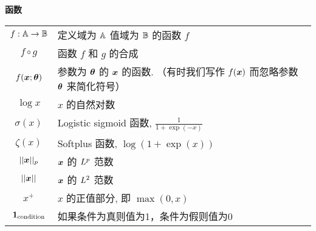 \begin{minipage}{\textwidth}
\centerline{\bf 函数}
\bgroup
\def\arraystretch{1.5}
\begin{tabular}{cp{3.25in}}
$\displaystyle f: {\mathbb{A}} \rightarrow {\mathbb{B}}$ & 定义域为 ${\mathbb{A}}$ 值域为 ${\mathbb{B}}$ 的函数 $f$ \\
$\displaystyle f \circ g $ & 函数 $f$ 和 $g$ 的合成 \\
  $\displaystyle f({\bm{x}} ; {\bm{\theta}}) $ & 参数为 ${\bm{\theta}}$ 的 ${\bm{x}}$ 的函数.
  （有时我们写作 $f({\bm{x}})$ 而忽略参数 ${\bm{\theta}}$ 来简化符号）\\
$\displaystyle \log x$ & $x$ 的自然对数 \\
$\displaystyle \sigma(x)$ & Logistic sigmoid 函数, $\displaystyle \frac{1} {1 + \exp(-x)}$ \\
$\displaystyle \zeta(x)$ & Softplus 函数, $\log(1 + \exp(x))$ \\
$\displaystyle || {\bm{x}} ||_p $ & ${\bm{x}}$ 的 $L^p$ 范数\\
$\displaystyle || {\bm{x}} || $ & ${\bm{x}}$ 的 $L^2$ 范数\\
$\displaystyle x^+$ & $x$ 的正值部分, 即 $\max(0,x)$\\
$\displaystyle \bm{1}_\mathrm{condition}$ & 如果条件为真则值为1，条件为假则值为0 \\
\end{tabular}
\egroup
{}
\end{minipage}

